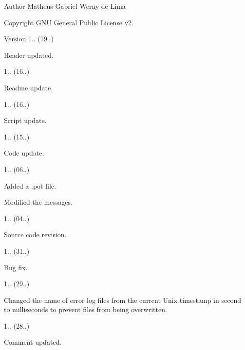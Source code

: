 \begin{DoxyAuthor}{Author}
Matheus Gabriel Werny de Lima 
\end{DoxyAuthor}
\begin{DoxyCopyright}{Copyright}
G\+NU General Public License v2. 
\end{DoxyCopyright}
\begin{DoxyVersion}{Version}
1.. (19..)
\begin{DoxyItemize}
\item Header updated. 
\end{DoxyItemize}

1.. (16..)
\begin{DoxyItemize}
\item Readme update. 
\end{DoxyItemize}

1.. (16..)
\begin{DoxyItemize}
\item Script update. 
\end{DoxyItemize}

1.. (15..)
\begin{DoxyItemize}
\item Code update. 
\end{DoxyItemize}

1.. (06..)
\begin{DoxyItemize}
\item Added a .pot file.
\item Modified the messages. 
\end{DoxyItemize}

1.. (04..)
\begin{DoxyItemize}
\item Source code revision. 
\end{DoxyItemize}

1.. (31..)
\begin{DoxyItemize}
\item Bug fix. 
\end{DoxyItemize}

1.. (29..)
\begin{DoxyItemize}
\item Changed the name of error log files from the current Unix timestamp in second to milliseconds to prevent files from being overwritten. 
\end{DoxyItemize}

1.. (28..)
\begin{DoxyItemize}
\item Comment updated. 
\end{DoxyItemize}


\end{DoxyVersion}
